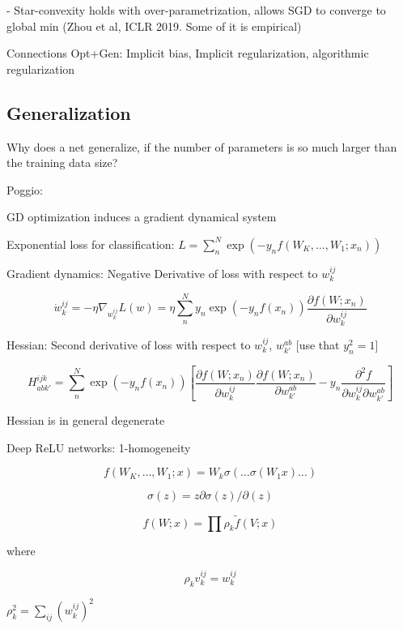 \documentclass[english]{article}
\begin{document}
- Star-convexity holds with over-parametrization, allows SGD to converge to global min (Zhou et al, ICLR 2019. Some of it is empirical) 


\item Connections Opt+Gen: Implicit bias, Implicit regularization, algorithmic regularization 

\eenum 

\eenum


\subsection{Generalization}


\benum
\item Why does a net generalize, if the number of parameters is so much larger than the training data size?

\item Poggio:

\benum
\item GD optimization induces a gradient dynamical system

\item Exponential loss for classification: $L  = \sum_n^N \exp(-y_n f(W_K,\ldots, W_1; x_n))$

Gradient dynamics: Negative Derivative of loss with respect to $w_k^{ij}$ 

$$
\dot w_k^{ij} 
= 
-\eta \nabla_{w_k^{ij}} L(w)
=
\eta
\sum_n^N y_n\exp(-y_n f(x_n))
\frac{\partial f(W;x_n)}{\partial w_k^{ij}}
$$

Hessian: Second derivative of loss with respect to $w_k^{ij}$, $w_{k'}^{ab}$  [use that $y_n^2=1$]

$$
H_{abk'}^{ijk}
= 
\sum_n^N \exp(-y_n f(x_n))
[
\frac{\partial f(W;x_n)}{\partial w_k^{ij}}
\frac{\partial f(W;x_n)}{\partial w_{k'}^{ab}}
-
y_n\frac{\partial^2f}{\partial w_k^{ij}\partial w_{k'}^{ab}}
]
$$

Hessian is in general degenerate

\item Deep ReLU networks: 1-homogeneity

$$f(W_K,\ldots, W_1; x) = W_k \sigma(\ldots \sigma (W_1x)\ldots)$$

$$\sigma(z) = z \partial \sigma(z)/\partial(z)$$

$$f(W;x) = \prod \rho_k \tilde f(V;x)$$

where 

$$\rho_k v_k^{ij} = w_k^{ij}$$

$\rho_k^2 = \sum_{ij} (w_k^{ij})^2$
\end{document}
